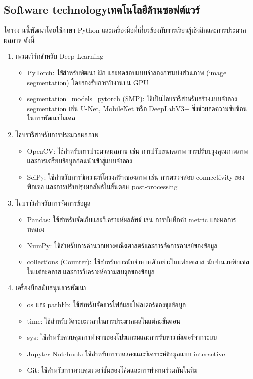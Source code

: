 \subsection{\ifenglish Software technology\else เทคโนโลยีด้านซอฟต์แวร์\fi}
โครงงานนี้พัฒนาโดยใช้ภาษา Python และเครื่องมือที่เกี่ยวข้องกับการเรียนรู้เชิงลึกและการประมวลผลภาพ ดังนี้
\begin{enumerate}
    \item เฟรมเวิร์กสำหรับ Deep Learning
        \begin{itemize}
            \item PyTorch: ใช้สำหรับพัฒนา ฝึก และทดสอบแบบจำลองการแบ่งส่วนภาพ (image segmentation) โดยรองรับการทำงานบน GPU
            \item segmentation\_models\_pytorch (SMP): ใช้เป็นไลบรารีสำหรับสร้างแบบจำลอง segmentation เช่น U-Net, MobileNet หรือ DeepLabV3+ ซึ่งช่วยลดความซับซ้อนในการพัฒนาโมเดล
        \end{itemize}
    \item ไลบรารีสำหรับการประมวลผลภาพ
        \begin{itemize}
            \item OpenCV: ใช้สำหรับการประมวลผลภาพ เช่น การปรับขนาดภาพ การปรับปรุงคุณภาพภาพ และการเตรียมข้อมูลก่อนนำเข้าสู่แบบจำลอง
            \item SciPy: ใช้สำหรับการวิเคราะห์โครงสร้างของภาพ เช่น การตรวจสอบ connectivity ของพิกเซล และการปรับปรุงผลลัพธ์ในขั้นตอน post-processing
        \end{itemize}
    \item ไลบรารีสำหรับการจัดการข้อมูล
        \begin{itemize}
            \item Pandas: ใช้สำหรับจัดเก็บและวิเคราะห์ผลลัพธ์ เช่น การบันทึกค่า metric และผลการทดลอง
            \item NumPy: ใช้สำหรับการคำนวณทางคณิตศาสตร์และการจัดการอาเรย์ของข้อมูล
            \item collections (Counter): ใช้สำหรับการนับจำนวนตัวอย่างในแต่ละคลาส นับจำนวนพิกเซลในแต่ละคลาส และการวิเคราะห์ความสมดุลของข้อมูล
        \end{itemize}
    \item เครื่องมือสนับสนุนการพัฒนา
        \begin{itemize}
            \item os และ pathlib: ใช้สำหรับจัดการไฟล์และโฟลเดอร์ของชุดข้อมูล
            \item time: ใช้สำหรับวัดระยะเวลาในการประมวลผลในแต่ละขั้นตอน
            \item sys: ใช้สำหรับควบคุมการทำงานของโปรแกรมและการรับพารามิเตอร์จากระบบ
            \item Jupyter Notebook: ใช้สำหรับการทดลองและวิเคราะห์ข้อมูลแบบ interactive
            \item Git: ใช้สำหรับการควบคุมเวอร์ชันของโค้ดและการทำงานร่วมกันในทีม
        \end{itemize}
\end{enumerate}


